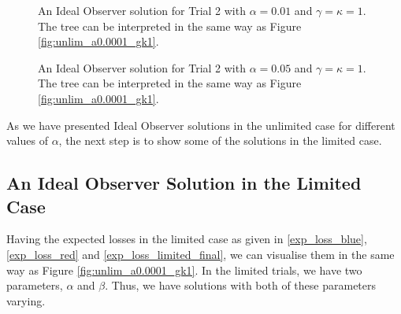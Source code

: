 \begin{figure}
    \centering
    \begin{minipage}{0.45\textwidth}
        \centering
        \scalebox{0.5}{}
        \caption[IO Solution for Trial 2. $\alpha=0.01$,$\gamma=\kappa=1$]{An Ideal Observer solution for Trial 2 with $\alpha=0.01$ and $\gamma=\kappa=1$. The tree can be interpreted in the same way as Figure \ref{fig:unlim_a0.0001_gk1}.}
        \label{fig:IO_trial2_a0.01}
    \end{minipage}\hfill
    \begin{minipage}{0.45\textwidth}
        \centering
        \scalebox{0.5}{}
        \caption[IO Solution for Trial 2. $\alpha=0.05$,$\gamma=\kappa=1$]{An Ideal Observer solution for Trial 2 with $\alpha=0.05$ and $\gamma=\kappa=1$. The tree can be interpreted in the same way as Figure \ref{fig:unlim_a0.0001_gk1}.}
        \label{fig:IO_trial2_a0.05}
    \end{minipage}
\end{figure}

As we have presented Ideal Observer solutions in the unlimited case for different values of $\alpha$, the next step is to show some of the solutions in the limited case. 




\subsection{An Ideal Observer Solution in the Limited Case}
Having the expected losses in the limited case as given in \eqref{exp_loss_blue}, \eqref{exp_loss_red} and \eqref{exp_loss_limited_final}, we can visualise them in the same way as Figure \ref{fig:unlim_a0.0001_gk1}. In the limited trials, we have two parameters, $\alpha$ and $\beta$. Thus, we have solutions with both of these parameters varying. 

